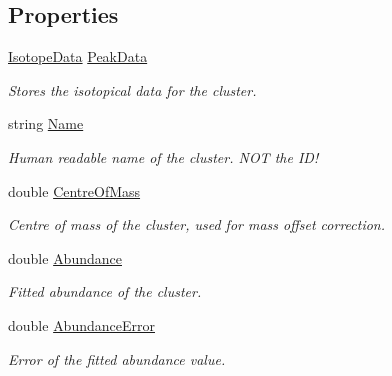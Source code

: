 \subsection*{Properties}
\begin{DoxyCompactItemize}
\item 
\hyperlink{class_isotope_fit_1_1_i_f_data_1_1_cluster_1_1_isotope_data}{Isotope\+Data} \hyperlink{class_isotope_fit_1_1_i_f_data_1_1_cluster_a9874ca075e89c301587ef9cdc1d7a5c6}{Peak\+Data}
\begin{DoxyCompactList}\small\item\em Stores the isotopical data for the cluster. \end{DoxyCompactList}\item 
string \hyperlink{class_isotope_fit_1_1_i_f_data_1_1_cluster_a8ae80358415b5637dbe46d2a211d03e7}{Name}
\begin{DoxyCompactList}\small\item\em Human readable name of the cluster. N\+OT the I\+D! \end{DoxyCompactList}\item 
double \hyperlink{class_isotope_fit_1_1_i_f_data_1_1_cluster_a43d9e77aebe1e02b617b16aff448c613}{Centre\+Of\+Mass}
\begin{DoxyCompactList}\small\item\em Centre of mass of the cluster, used for mass offset correction. \end{DoxyCompactList}\item 
double \hyperlink{class_isotope_fit_1_1_i_f_data_1_1_cluster_ac7dbcceda366fd00ce0c12f1cdd35fea}{Abundance}
\begin{DoxyCompactList}\small\item\em Fitted abundance of the cluster. \end{DoxyCompactList}\item 
double \hyperlink{class_isotope_fit_1_1_i_f_data_1_1_cluster_a3658f5cbf7c18d18af2164998c30661f}{Abundance\+Error}
\begin{DoxyCompactList}\small\item\em Error of the fitted abundance value. \end{DoxyCompactList}\item 

\end{DoxyCompactItemize}
